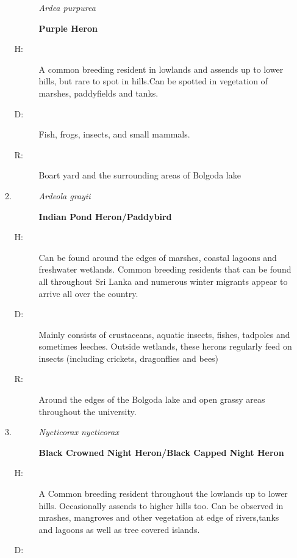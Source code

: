 \begin{itemize}
\begin{enumerate}
\begin{description}
\item[]%
\textit{Ardea purpurea}%
\item[]%
\textbf{Purple Heron}%
\end{description}%
\begin{description}%
\item[H: ]%
A common breeding resident in lowlands and assends up to lower hills, but rare to spot in hills.Can be spotted in vegetation of marshes, paddyfields and tanks. %
\item[D: ]%
Fish, frogs, insects, and small mammals.%
\item[R: ]%
Boart yard and the surrounding areas of Bolgoda lake%
\end{description}%
\item%
\begin{description}%
\item[]%
\textit{Ardeola grayii}%
\item[]%
\textbf{Indian Pond Heron/Paddybird}%
\end{description}%
\begin{description}%
\item[H: ]%
Can be found around the edges of marshes, coastal lagoons and freshwater wetlands. Common breeding residents that can be found all throughout Sri Lanka and numerous winter migrants appear to arrive all over the country. %
\item[D: ]%
Mainly consists of crustaceans, aquatic insects, fishes, tadpoles and sometimes leeches. Outside wetlands, these herons regularly feed on insects (including crickets, dragonflies and bees)%
\item[R: ]%
Around the edges of the Bolgoda lake and open grassy areas throughout the university.%
\end{description}%
\item%
\begin{description}%
\item[]%
\textit{Nycticorax nycticorax}%
\item[]%
\textbf{Black Crowned Night Heron/Black Capped Night Heron}%
\end{description}%
\begin{description}%
\item[H: ]%
A Common breeding resident throughout the lowlands  up to lower hills. Occasionally assends to higher hills too. Can be observed in mrashes, mangroves and other vegetation at edge of rivers,tanks and lagoons as well as tree covered islands.%
\item[D: ]%

\end{description}
\end{enumerate}
\end{itemize}
